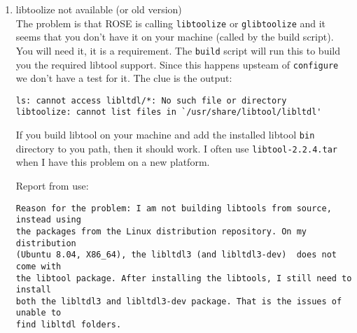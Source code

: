 \begin{enumerate}
   \item libtoolize not available (or old version) \\
  The problem is that ROSE is calling {\tt libtoolize} or {\tt glibtoolize} and 
it seems that you don't have it on your machine (called by the build script). 
You will need it, it is a requirement. The {\tt build} script will run this to build you the
required libtool support.  Since this happens upsteam of {\tt configure} we don't have a test
for it. The clue is the output:
\begin{verbatim}
ls: cannot access libltdl/*: No such file or directory
libtoolize: cannot list files in `/usr/share/libtool/libltdl'
\end{verbatim}
If you build libtool on your machine and add the installed libtool {\tt bin} directory
to you path, then it should work.  I often use {\tt libtool-2.2.4.tar} when I have 
this problem on a new platform.

Report from use:
\begin{verbatim}
Reason for the problem: I am not building libtools from source, instead using
the packages from the Linux distribution repository. On my distribution
(Ubuntu 8.04, X86_64), the libltdl3 (and libltdl3-dev)  does not come with
the libtool package. After installing the libtools, I still need to install
both the libltdl3 and libltdl3-dev package. That is the issues of unable to
find libltdl folders.
\end{verbatim}


\end{enumerate}

